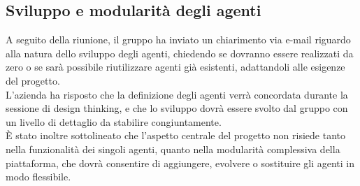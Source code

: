 \subsection{Sviluppo e modularità degli agenti}
A seguito della riunione, il gruppo ha inviato un chiarimento via e-mail riguardo alla natura dello sviluppo degli agenti, chiedendo se dovranno essere realizzati da zero o se sarà possibile riutilizzare agenti già esistenti, adattandoli alle esigenze del progetto.\\
L’azienda ha risposto che la definizione degli agenti verrà concordata durante la sessione di design thinking, e che lo sviluppo dovrà essere svolto dal gruppo con un livello di dettaglio da stabilire congiuntamente.\\
È stato inoltre sottolineato che l’aspetto centrale del progetto non risiede tanto nella funzionalità dei singoli agenti, quanto nella modularità complessiva della piattaforma, che dovrà consentire di aggiungere, evolvere o sostituire gli agenti in modo flessibile.